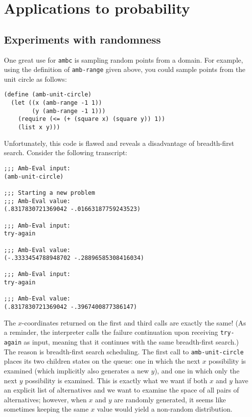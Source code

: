 \documentclass{article}
\begin{document}
\section{Applications to probability}

\subsection{Experiments with randomness}

One great use for \texttt{ambc} is sampling random points from a domain. For
example, using the definition of \texttt{amb-range} given above, you could
sample points from the unit circle as follows:
\begin{lstlisting}
(define (amb-unit-circle)
  (let ((x (amb-range -1 1))
        (y (amb-range -1 1)))
    (require (<= (+ (square x) (square y)) 1))
    (list x y)))
\end{lstlisting}

Unfortunately, this code is flawed and reveals a disadvantage of
breadth-first search. Consider the following transcript:
\begin{lstlisting}
;;; Amb-Eval input:
(amb-unit-circle)

;;; Starting a new problem
;;; Amb-Eval value:
(.8317830721369042 -.01663187759243523)

;;; Amb-Eval input:
try-again

;;; Amb-Eval value:
(-.3333454788948702 -.28896585308416034)

;;; Amb-Eval input:
try-again

;;; Amb-Eval value:
(.8317830721369042 -.3967400877386147)
\end{lstlisting}

The $x$-coordinates returned on the first and third calls are exactly the same!
(As a reminder, the interpreter calls the failure continuation upon receiving
\texttt{try-again} as input, meaning that it continues with the same
breadth-first search.) The reason is breadth-first search scheduling. The first
call to \texttt{amb-unit-circle} places its two children states on the queue:
one in which the next $x$ possibility is examined (which implicitly also
generates a new $y$), and one in which only the next $y$ possibility is
examined. This is exactly what we want if both $x$ and $y$ have an explicit
list of alternatives and we want to examine the space of all pairs of
alternatives; however, when $x$ and $y$ are randomly generated, it seems like
sometimes keeping the same $x$ value would yield a non-random distribution.
\end{document}
